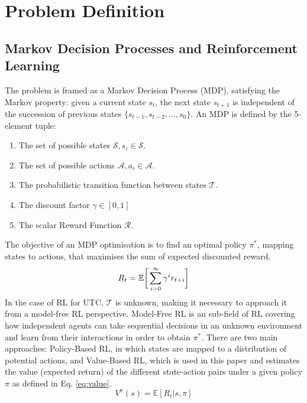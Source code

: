 \documentclass[conference]{IEEEtran}
\begin{document}
\section{Problem Definition}
\label{problem}
\subsection{Markov Decision Processes and Reinforcement Learning}
The problem is framed as a Markov Decision Process (MDP), satisfying the Markov property: given a current state $s_t$, the next state $s_{t+1}$ is independent of the succession of previous states $\{s_{t-1}, s_{t-2}, ..., s_0\}$.
An MDP is defined by the 5-element tuple:
\begin{enumerate}
\item The set of possible states $\mathcal{S}, s_i\in \mathcal{S}$.
\item The set of possible actions $\mathcal{A}, a_i\in \mathcal{A}$.
\item The probabilistic transition function between states $\mathcal{T}$.
\item The discount factor $\gamma \in [0,1]$ 
\item The scalar Reward Function $\mathcal{R}$. 
\end{enumerate}

The objective of an MDP optimisation is to find an optimal policy $\pi^*$, mapping states to actions, that maximises the sum of expected discounted reward.
\begin{equation}
R_t = \mathbb{E} \bigg{[} \sum^{\infty}_{i=0} \gamma^i r_{t+i} \bigg{]} 
\label{eq:reward}
\end{equation}
In the case of RL for UTC, $\mathcal{T}$ is unknown, making it necessary to approach it from a model-free RL perspective.
Model-Free RL is an sub-field of RL covering how independent agents can take sequential decisions in an unknown environment and learn from their interactions in order to obtain $\pi^*$. 
There are two main approaches: Policy-Based RL, in which states are mapped to a distribution of potential actions, and Value-Based RL, which is used in this paper and estimates the value (expected return) of the different state-action pairs under a given policy $\pi$ as defined in Eq. \ref{eq:value}.
\begin{equation}
V^{\pi}(s) = \mathbb{E} [R_t|s,\pi]
\label{eq:value}
\end{equation}
\end{document}
